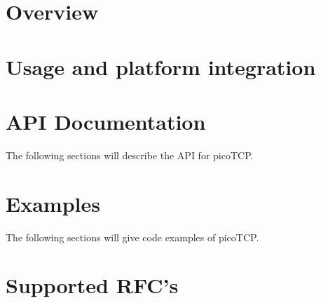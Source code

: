 

\tableofcontents

%

\chapter{Overview}
\label{chap:overview}



\chapter{Usage and platform integration}
\label{chap:usage}



\chapter{API Documentation}
\label{chap:api_doc}
The following sections will describe the API for picoTCP.

















\chapter{Examples}
\label{chap:examples}
The following sections will give code examples of picoTCP.



\appendix

%

\chapter{Supported RFC's}
\label{chap:rfcs}



